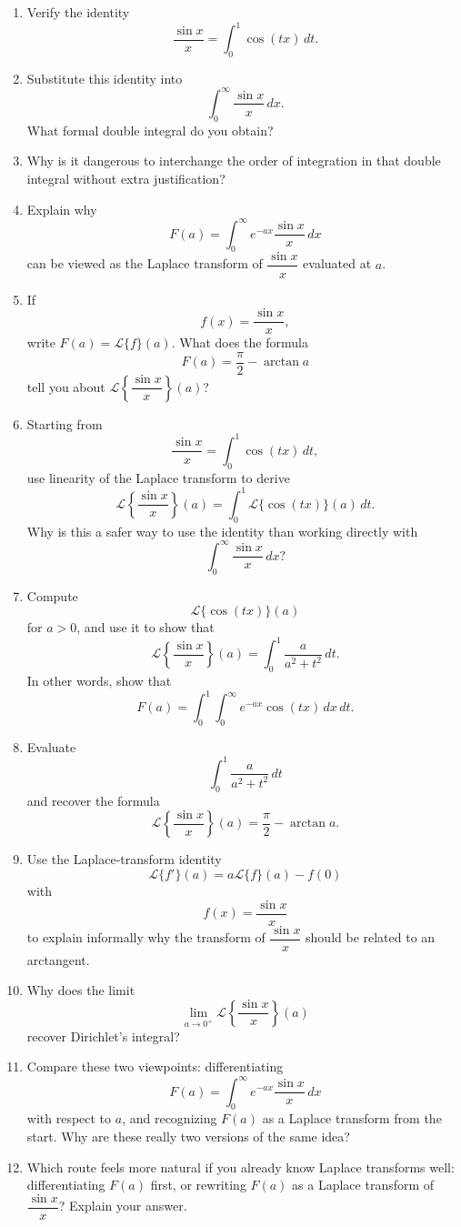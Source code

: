 \begin{enumerate}
  \item Verify the identity
    \[ \frac{\sin x}{x}=\int_{0}^{1} \cos(tx)\,dt. \]
  \item Substitute this identity into
    \[ \int_{0}^{\infty} \frac{\sin x}{x}\,dx. \]
    What formal double integral do you obtain?
  \item Why is it dangerous to interchange the order of integration in that double integral without extra justification?

  \item Explain why
    \[ F(a)=\int_{0}^{\infty} e^{-ax}\frac{\sin x}{x}\,dx \]
    can be viewed as the Laplace transform of \(\dfrac{\sin x}{x}\) evaluated at \(a\).
  \item If
    \[ f(x)=\frac{\sin x}{x}, \]
    write \(F(a)=\mathcal{L}\{f\}(a)\). What does the formula
    \[ F(a)=\frac{\pi}{2}-\arctan a \]
    tell you about \(\mathcal{L}\!\left\{\dfrac{\sin x}{x}\right\}(a)\)?
  \item Starting from
    \[ \frac{\sin x}{x}=\int_{0}^{1} \cos(tx)\,dt, \]
    use linearity of the Laplace transform to derive
    \[ \mathcal{L}\!\left\{\frac{\sin x}{x}\right\}(a) = \int_{0}^{1} \mathcal{L}\{\cos(tx)\}(a)\,dt. \]
    Why is this a safer way to use the identity than working directly with
    \[ \int_{0}^{\infty} \frac{\sin x}{x}\,dx? \]
  \item Compute
    \[ \mathcal{L}\{\cos(tx)\}(a) \]
    for \(a>0\), and use it to show that
    \[ \mathcal{L}\!\left\{\frac{\sin x}{x}\right\}(a) = \int_{0}^{1} \frac{a}{a^{2}+t^{2}}\,dt. \]
    In other words, show that
    \[ F(a)=\int_{0}^{1} \int_{0}^{\infty} e^{-ax}\cos(tx)\,dx\,dt. \]
  \item Evaluate
    \[ \int_{0}^{1} \frac{a}{a^{2}+t^{2}}\,dt \]
    and recover the formula
    \[ \mathcal{L}\!\left\{\frac{\sin x}{x}\right\}(a) = \frac{\pi}{2}-\arctan a. \]
  \item Use the Laplace-transform identity
    \[ \mathcal{L}\{f'\}(a)=a\mathcal{L}\{f\}(a)-f(0) \]
    with
    \[ f(x)=\frac{\sin x}{x} \]
    to explain informally why the transform of \(\dfrac{\sin x}{x}\) should be related to an arctangent.
  \item Why does the limit
    \[ \lim_{a\to 0^+}\mathcal{L}\!\left\{\frac{\sin x}{x}\right\}(a) \]
    recover Dirichlet's integral?
  \item Compare these two viewpoints: differentiating
    \[ F(a)=\int_{0}^{\infty} e^{-ax}\frac{\sin x}{x}\,dx \]
    with respect to \(a\), and recognizing \(F(a)\) as a Laplace transform from the start. Why are these really two versions of the same idea?
  \item Which route feels more natural if you already know Laplace transforms well: differentiating \(F(a)\) first, or rewriting \(F(a)\) as a Laplace transform of \(\dfrac{\sin x}{x}\)? Explain your answer.


\end{enumerate}
